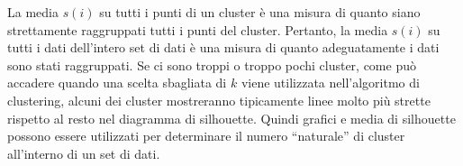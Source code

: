 La media $s(i)$ su tutti i punti di un cluster è una misura di quanto siano
strettamente raggruppati tutti i punti del cluster. Pertanto, la media $s(i)$ su
tutti i dati dell'intero set di dati è una misura di quanto adeguatamente i dati
sono stati raggruppati. Se ci sono troppi o troppo pochi cluster, come può accadere
quando una scelta sbagliata di $k$ viene utilizzata nell'algoritmo di clustering,
alcuni dei cluster mostreranno tipicamente linee molto più strette rispetto al
resto nel diagramma di silhouette. Quindi grafici e media di silhouette possono
essere utilizzati per determinare il numero “naturale” di cluster all'interno di
un set di dati.